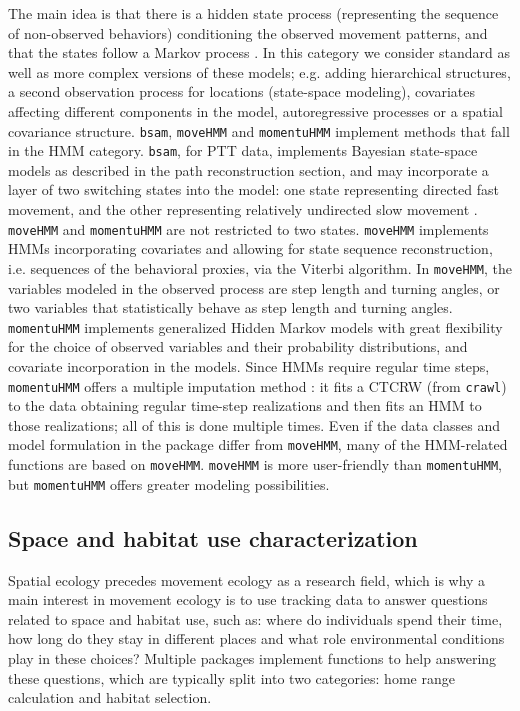 \documentclass[a4paper,12pt]{article}
\newcommand{\Rpkg}[1]{\texttt{#1}}
\begin{document}
The main idea is that there is a hidden state process (representing the sequence of non-observed behaviors) conditioning the observed movement patterns, and that the states follow a Markov process \citep{Langrock2012}. In this category we consider standard as well as more complex versions of these models; e.g. adding hierarchical structures, a second observation process for locations (state-space modeling), covariates affecting different components in the model, autoregressive processes or a spatial covariance structure. \Rpkg{bsam}, \Rpkg{moveHMM} and \Rpkg{momentuHMM} implement methods that fall in the HMM category. \Rpkg{bsam}, for PTT data, implements Bayesian state-space models as described in the path reconstruction section, and may incorporate a layer of two switching states into the model: one state representing directed fast movement, and the other representing relatively undirected slow movement \citep{Jonsen2013}. \Rpkg{moveHMM} and \Rpkg{momentuHMM} are not restricted to two states. \Rpkg{moveHMM} implements HMMs incorporating covariates and allowing for state sequence reconstruction, i.e. sequences of the behavioral proxies, via the Viterbi algorithm. In \Rpkg{moveHMM}, the variables modeled in the observed process are step length and turning angles, or two variables that statistically behave as step length and turning angles. \Rpkg{momentuHMM} implements generalized Hidden Markov models \citep{McClintock2012} with great flexibility for the choice of observed variables and their probability distributions, and covariate incorporation in the models. Since HMMs require regular time steps, \Rpkg{momentuHMM} offers a multiple imputation method \citep{McClintock2017}: it fits a CTCRW (from \Rpkg{crawl}) to the data obtaining regular time-step realizations and then fits an HMM to those realizations; all of this is done multiple times. Even if the data classes and model formulation in the package differ from \Rpkg{moveHMM}, many of the HMM-related functions are based on \Rpkg{moveHMM}. \Rpkg{moveHMM} is more user-friendly than \Rpkg{momentuHMM}, but \Rpkg{momentuHMM} offers greater modeling possibilities. 

\subsection*{Space and habitat use characterization}

Spatial ecology precedes movement ecology as a research field, which is why a main interest in movement ecology is to use tracking data to answer questions related to space and habitat use, such as: where do individuals spend their time, how long do they stay in different places and what role environmental conditions play in these choices? Multiple packages implement functions to help answering these questions, which are typically split into two categories: home range calculation and habitat selection.
\end{document}
